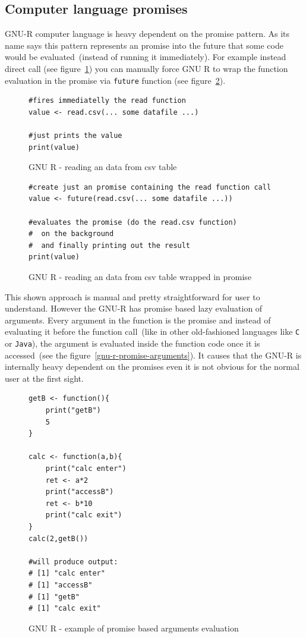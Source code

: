 \documentclass[thesis=M,english]{FITthesis}[2018/10/20]
\newcommand{\code}[1]{\texttt{#1}}
\begin{document}
\subsection{Computer language promises}\label{computer-promises}

GNU-R computer language is heavy dependent on the promise pattern. As its name says this pattern represents an promise into the future that some code would be evaluated~(instead of running it immediately). For example instead direct call (see figure~\ref{fig:reading-csv-without-promise}) you can manually force GNU R to wrap the function evaluation in the promise via \code{future} function (see figure~\ref{fig:reading-csv-with-promise}).

\begin{figure}[!h]
\begin{lstlisting}
#fires immediatelly the read function
value <- read.csv(... some datafile ...)

#just prints the value
print(value)
\end{lstlisting}
\caption{\label{fig:reading-csv-without-promise} GNU R - reading an data from csv table}
\end{figure}

\begin{figure}[!h]
\begin{lstlisting}
#create just an promise containing the read function call
value <- future(read.csv(... some datafile ...))

#evaluates the promise (do the read.csv function)
#  on the background
#  and finally printing out the result
print(value)
\end{lstlisting}
\caption{\label{fig:reading-csv-with-promise} GNU R - reading an data from csv table wrapped in promise}
\end{figure}

This shown approach is manual and pretty straightforward for user to understand. However the GNU-R has promise based lazy evaluation of arguments. Every argument in the function is the promise and instead of evaluating it before the function call~(like in other old-fashioned languages like \code{C} or \code{Java}), the argument is evaluated inside the function code once it is accessed~(see the figure~\ref{gnu-r-promise-arguments}). It causes that the GNU-R is internally heavy dependent on the promises even it is not obvious for the normal user at the first sight.

\begin{figure}[!h]
\begin{lstlisting}
getB <- function(){
	print("getB")
	5
}

calc <- function(a,b){
	print("calc enter")
	ret <- a*2
	print("accessB")
	ret <- b*10
	print("calc exit")
}
calc(2,getB())

#will produce output:
# [1] "calc enter"
# [1] "accessB"
# [1] "getB"
# [1] "calc exit"
\end{lstlisting}
\caption{\label{fig:gnu-r-promise-arguments} GNU R - example of promise based arguments evaluation}
\end{figure}
\end{document}
